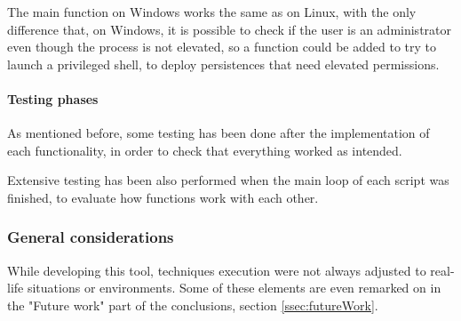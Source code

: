 The main function on Windows works the same as on Linux, with the only difference that, on Windows, it is possible to check if the user is an administrator even though the process is not elevated, so a function could be added to try to launch a privileged shell, to deploy persistences that need elevated permissions.

\pagebreak
\paragraph{Testing phases}
As mentioned before, some testing has been done after the implementation of each functionality, in order to check that everything worked as intended.

Extensive testing has been also performed when the main loop of each script was finished, to evaluate how functions work with each other.


\subsubsection{General considerations}
While developing this tool, techniques execution were not always adjusted to real-life situations or environments. Some of these elements are even remarked on in the "Future work" part of the conclusions, section \ref{ssec:futureWork}.


